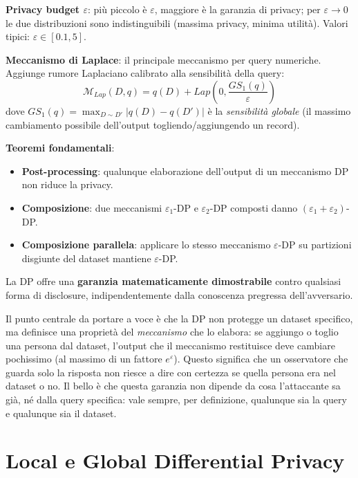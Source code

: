 \documentclass[a4paper,11pt]{article}
\begin{document}
\textbf{Privacy budget $\varepsilon$}: pi\`{u} piccolo \`{e} $\varepsilon$, maggiore \`{e} la garanzia di privacy; per $\varepsilon \to 0$ le due distribuzioni sono indistinguibili (massima privacy, minima utilit\`{a}). Valori tipici: $\varepsilon \in [0.1, 5]$.

\textbf{Meccanismo di Laplace}: il principale meccanismo per query numeriche. Aggiunge rumore Laplaciano calibrato alla sensibilit\`{a} della query:
\[
\mathcal{M}_{Lap}(D, q) = q(D) + Lap\!\left(0, \frac{GS_1(q)}{\varepsilon}\right)
\]
dove $GS_1(q) = \max_{D \sim D'} |q(D) - q(D')|$ \`{e} la \emph{sensibilit\`{a} globale} (il massimo cambiamento possibile dell'output togliendo/aggiungendo un record).

\textbf{Teoremi fondamentali}:
\begin{itemize}
  \item \textbf{Post-processing}: qualunque elaborazione dell'output di un meccanismo DP non riduce la privacy.
  \item \textbf{Composizione}: due meccanismi $\varepsilon_1$-DP e $\varepsilon_2$-DP composti danno $(\varepsilon_1 + \varepsilon_2)$-DP.
  \item \textbf{Composizione parallela}: applicare lo stesso meccanismo $\varepsilon$-DP su partizioni disgiunte del dataset mantiene $\varepsilon$-DP.
\end{itemize}

La DP offre una \textbf{garanzia matematicamente dimostrabile} contro qualsiasi forma di disclosure, indipendentemente dalla conoscenza pregressa dell'avversario.

\begin{nota}
Il punto centrale da portare a voce \`{e} che la DP non protegge un dataset specifico, ma definisce una propriet\`{a} del \emph{meccanismo} che lo elabora: se aggiungo o toglio una persona dal dataset, l'output che il meccanismo restituisce deve cambiare pochissimo (al massimo di un fattore $e^\varepsilon$). Questo significa che un osservatore che guarda solo la risposta non riesce a dire con certezza se quella persona era nel dataset o no. Il bello \`{e} che questa garanzia non dipende da cosa l'attaccante sa gi\`{a}, n\'{e} dalla query specifica: vale sempre, per definizione, qualunque sia la query e qualunque sia il dataset.
\end{nota}

\section{Local e Global Differential Privacy}
\end{document}
